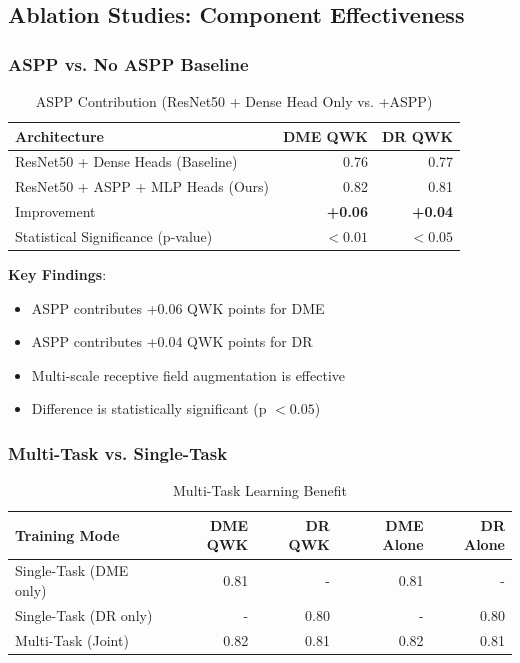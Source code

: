 \subsection{Ablation Studies: Component Effectiveness}

\subsubsection{ASPP vs. No ASPP Baseline}

\begin{table}[H]
\centering
\small
\caption{ASPP Contribution (ResNet50 + Dense Head Only vs. +ASPP)}
\begin{tabular}{|l|r|r|}
\hline
\textbf{Architecture} & \textbf{DME QWK} & \textbf{DR QWK} \\
\hline
ResNet50 + Dense Heads (Baseline) & 0.76 & 0.77 \\
ResNet50 + ASPP + MLP Heads (Ours) & 0.82 & 0.81 \\
Improvement & \textbf{+0.06} & \textbf{+0.04} \\
Statistical Significance (p-value) & $< 0.01$ & $< 0.05$ \\
\hline
\end{tabular}
\end{table}

\textbf{Key Findings}:
\begin{itemize}
    \item ASPP contributes +0.06 QWK points for DME
    \item ASPP contributes +0.04 QWK points for DR
    \item Multi-scale receptive field augmentation is effective
    \item Difference is statistically significant (p $< 0.05$)
\end{itemize}

\subsubsection{Multi-Task vs. Single-Task}

\begin{table}[H]
\centering
\small
\caption{Multi-Task Learning Benefit}
\begin{tabular}{|l|r|r|r|r|}
\hline
\textbf{Training Mode} & \textbf{DME QWK} & \textbf{DR QWK} & \textbf{DME Alone} & \textbf{DR Alone} \\
\hline
Single-Task (DME only) & 0.81 & - & 0.81 & - \\
Single-Task (DR only) & - & 0.80 & - & 0.80 \\
Multi-Task (Joint) & 0.82 & 0.81 & 0.82 & 0.81 \\
\hline
\end{tabular}
\end{table}

